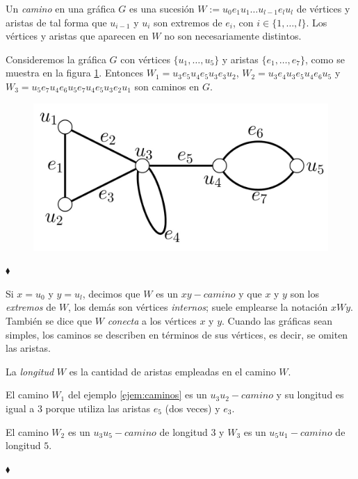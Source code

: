 Un \textit{camino}  en una gráfica $G$ es una sucesión $W:= u_{0}e_{1}u_{1}\ldots u_{l-1}e_{l}u_{l}$ de vértices y aristas de tal forma que $u_{i-1}$ y $u_{i}$ son extremos de $e_{i}$, con $i\in\{1, \ldots, l\}$. Los vértices y aristas que aparecen en $W$ no son necesariamente distintos.


\begin{ejem} \label{ejem:caminos}
Consideremos la gráfica $G$ con vértices $\{u_{1}, \ldots, u_{5}\}$ y aristas $\{e_{1}, \ldots, e_{7}\}$, como se muestra en la figura \ref{fig:GrafoCaminos}.
Entonces $W_{1}=u_{3}e_{5}u_{4}e_{5}u_{3}e_{3}u_{2}$, $W_{2}=u_{3}e_{4}u_{3}e_{5}u_{4}e_{6}u_{5}$ y $W_{3}=u_{5}e_{7}u_{4}e_{6}u_{5}e_{7}u_{4}e_{5}u_{3}e_{2}u_{1}$ son caminos en $G$. 

\begin{figure}[H]
    \centering
    \includegraphics[scale=0.3]{img/imgchapter1/GrafoCaminos.jpg}
    \caption{}
    \label{fig:GrafoCaminos}
\end{figure}

\hfill $\blacklozenge$
\end{ejem}


Si $x = u_{0}$ y $y = u_{l}$, decimos que $W$ es un $xy-camino$ y que $x$ y $y$ son los \textit{extremos} de $W$, los demás son vértices \textit{internos}; suele emplearse la notación $xWy$. También se dice que $W$ \textit{conecta} a los vértices $x$ y $y$. Cuando las gráficas sean simples, los caminos se describen en términos de sus vértices, es decir, se omiten las aristas.

La \textit{longitud}  $W$ es la cantidad de aristas empleadas en el camino $W$.

\begin{ejem}
El camino $W_{1}$ del ejemplo \ref{ejem:caminos} es un $u_{3}u_{2}-camino$ y su longitud es igual a $3$ porque utiliza las aristas $e_{5}$ (dos veces) y $e_{3}$.

El camino $W_{2}$ es un $u_{3}u_{5}-camino$ de longitud $3$ y $W_{3}$ es un $u_{5}u_{1}-camino$ de longitud $5$.


\hfill $\blacklozenge$
\end{ejem}


